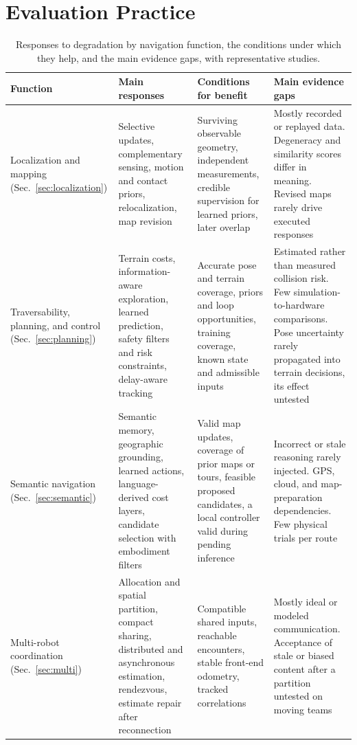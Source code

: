 \section{Evaluation Practice}
\label{sec:evaluation}

\begin{table}[t]
\centering
\caption{Responses to degradation by navigation function, the conditions under which they help, and the main evidence gaps, with representative studies.}
\label{tab:synthesis}
\surveytableformat
\begin{tabularx}{\linewidth}{@{}L{2.35cm}YYY@{}}
\toprule
\textbf{Function} & \textbf{Main responses} & \textbf{Conditions for benefit} & \textbf{Main evidence gaps} \\
\midrule
Localization and mapping (Sec.~\ref{sec:localization}) & Selective updates, complementary sensing, motion and contact priors, relocalization, map revision~\cite{P_E01,P_F04,P_E02} & Surviving observable geometry, independent measurements, credible supervision for learned priors, later overlap~\cite{P_S37,P_E07,P_E08} & Mostly recorded or replayed data. Degeneracy and similarity scores differ in meaning. Revised maps rarely drive executed responses~\cite{P_K01,P_R07} \\
\addlinespace[3pt]
Traversability, planning, and control (Sec.~\ref{sec:planning}) & Terrain costs, information-aware exploration, learned prediction, safety filters and risk constraints, delay-aware tracking~\cite{P_K03,P_E13,P_E26} & Accurate pose and terrain coverage, priors and loop opportunities, training coverage, known state and admissible inputs~\cite{P_S45,P_N05,P_M42} & Estimated rather than measured collision risk. Few simulation-to-hardware comparisons. Pose uncertainty rarely propagated into terrain decisions, its effect untested~\cite{P_E25,P_K05} \\
\addlinespace[3pt]
Semantic navigation (Sec.~\ref{sec:semantic}) & Semantic memory, geographic grounding, learned actions, language-derived cost layers, candidate selection with embodiment filters~\cite{P_E44,P_M10,P_R26} & Valid map updates, coverage of prior maps or tours, feasible proposed candidates, a local controller valid during pending inference~\cite{P_S43,P_F05} & Incorrect or stale reasoning rarely injected. GPS, cloud, and map-preparation dependencies. Few physical trials per route~\cite{P_S44,P_S40,P_R25} \\
\addlinespace[3pt]
Multi-robot coordination (Sec.~\ref{sec:multi}) & Allocation and spatial partition, compact sharing, distributed and asynchronous estimation, rendezvous, estimate repair after reconnection~\cite{P_R22,P_R21,P_R19} & Compatible shared inputs, reachable encounters, stable front-end odometry, tracked correlations~\cite{P_E34,P_R20,P_F03} & Mostly ideal or modeled communication. Acceptance of stale or biased content after a partition untested on moving teams~\cite{P_R23,P_K07} \\

\end{tabularx}
\end{table}
